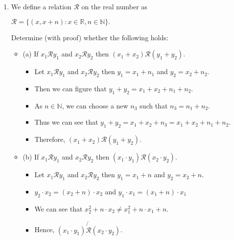 \documentclass[letterpaper,12pt]{article}
\begin{document}
\begin{enumerate}
\item We define a relation $\mathcal{R}$ on the real number as 
\begin{center}
	$\mathcal{R} = \{ (x,x+n):x\in \mathbb{R},n \in \mathbb{N}\}.$
\end{center}
Determine (with proof) whether the following holds:
\begin{itemize}
	\item (a) If $x_1 \mathrel \mathcal{R} y_1 $ and $ x_2 \mathrel \mathcal{R} y_2$ then $(x_1+x_2) \mathrel \mathcal{R} (y_1+y_2).$
	\begin{itemize}
	\item Let $x_1 \mathrel \mathcal{R} y_1 $ and $ x_2 \mathrel \mathcal{R} y_2$ then $y_1 = x_1 +n_1$ and $y_2 = x_2 + n_2$.
	\item Then we can figure that $y_1 + y_2 = x_1 + x_2 + n_1 + n_2$.
	\item As $n \in \mathbb{N}$, we can choose a new $n_3$ such that $n_ 3 = n_1 + n_2 $.
	\item Thus we can see that $y_1+y_2 = x_1+x_2 +n_3 = x_1 + x_2 +n_1 + n_2$.
	\item Therefore, $(x_1+x_2) \mathrel \mathcal{R} (y_1+y_2)$.
	\end{itemize}
	\item (b) If $x_1 \mathrel \mathcal{R} y_1 $ and $ x_2 \mathrel \mathcal{R} y_2$ then $(x_1\cdot y_1) \mathrel \mathcal{R} (x_2\cdot y_2).$
	\begin{itemize}
	\item Let $x_1 \mathrel \mathcal{R} y_1 $ and $ x_2 \mathrel \mathcal{R} y_2$ then $y_1 = x_1 + n$ and $ y_2 = x_2+n$.
	\item $y_2 \cdot x_2 = (x_2+n) \cdot x_2$ and $y_1\cdot x_1 = (x_1+n)\cdot x_1$
	\item We can see that $x_2^2+n\cdot x_2 \neq x_1^2+n\cdot x_1 + n $.
	\item Hence, $(x_1\cdot y_1) \not{\mathcal{R}} (x_2 \cdot y_2)$.
	\end{itemize}
\end{itemize}


\end{enumerate}
\end{document}
